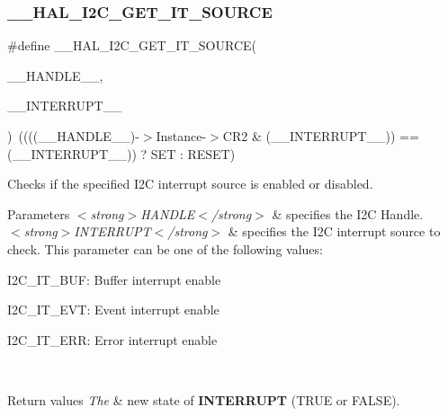\subsubsection{\texorpdfstring{\+\_\+\+\_\+\+H\+A\+L\+\_\+\+I2\+C\+\_\+\+G\+E\+T\+\_\+\+I\+T\+\_\+\+S\+O\+U\+R\+CE}{\_\_HAL\_I2C\_GET\_IT\_SOURCE}}
{\footnotesize\ttfamily \#define \+\_\+\+\_\+\+H\+A\+L\+\_\+\+I2\+C\+\_\+\+G\+E\+T\+\_\+\+I\+T\+\_\+\+S\+O\+U\+R\+CE(\begin{DoxyParamCaption}\item[{}]{\+\_\+\+\_\+\+H\+A\+N\+D\+L\+E\+\_\+\+\_\+,  }\item[{}]{\+\_\+\+\_\+\+I\+N\+T\+E\+R\+R\+U\+P\+T\+\_\+\+\_\+ }\end{DoxyParamCaption})~((((\+\_\+\+\_\+\+H\+A\+N\+D\+L\+E\+\_\+\+\_\+)-\/$>$Instance-\/$>$C\+R2 \& (\+\_\+\+\_\+\+I\+N\+T\+E\+R\+R\+U\+P\+T\+\_\+\+\_\+)) == (\+\_\+\+\_\+\+I\+N\+T\+E\+R\+R\+U\+P\+T\+\_\+\+\_\+)) ? S\+ET \+: R\+E\+S\+ET)}



Checks if the specified I2C interrupt source is enabled or disabled. 


\begin{DoxyParams}{Parameters}
{\em $<$strong$>$\+H\+A\+N\+D\+L\+E$<$/strong$>$} & specifies the I2C Handle. \\
\hline
{\em $<$strong$>$\+I\+N\+T\+E\+R\+R\+U\+P\+T$<$/strong$>$} & specifies the I2C interrupt source to check. This parameter can be one of the following values\+: \begin{DoxyItemize}
\item I2\+C\+\_\+\+I\+T\+\_\+\+B\+UF\+: Buffer interrupt enable \item I2\+C\+\_\+\+I\+T\+\_\+\+E\+VT\+: Event interrupt enable \item I2\+C\+\_\+\+I\+T\+\_\+\+E\+RR\+: Error interrupt enable \end{DoxyItemize}
\\
\hline
\end{DoxyParams}

\begin{DoxyRetVals}{Return values}
{\em The} & new state of {\bfseries I\+N\+T\+E\+R\+R\+U\+PT} (T\+R\+UE or F\+A\+L\+SE). \\
\hline
\end{DoxyRetVals}
\mbox{\label{group___i2_c___exported___macros_ga74c8fd72a78882720c28448ce8bd33d8}} 

